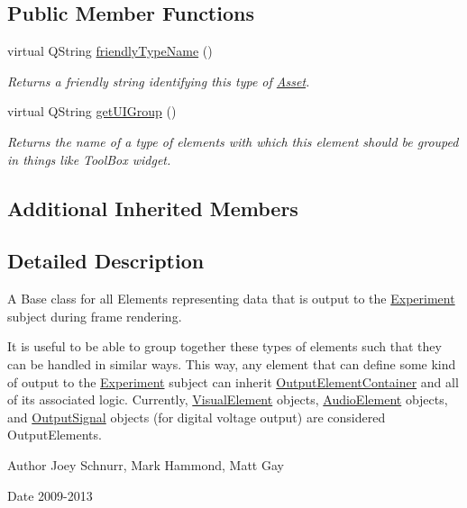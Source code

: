 \subsection*{Public Member Functions}
\begin{DoxyCompactItemize}
\item 
virtual Q\-String \hyperlink{class_picto_1_1_output_element_add3a6e0fe3d4ee7b4b466171eb437cbc}{friendly\-Type\-Name} ()
\begin{DoxyCompactList}\small\item\em Returns a friendly string identifying this type of \hyperlink{class_picto_1_1_asset}{Asset}. \end{DoxyCompactList}\item 
\hypertarget{class_picto_1_1_output_element_a711908f1d7aea5caf829c1f2b79ea60a}{virtual Q\-String \hyperlink{class_picto_1_1_output_element_a711908f1d7aea5caf829c1f2b79ea60a}{get\-U\-I\-Group} ()}\label{class_picto_1_1_output_element_a711908f1d7aea5caf829c1f2b79ea60a}

\begin{DoxyCompactList}\small\item\em Returns the name of a type of elements with which this element should be grouped in things like Tool\-Box widget. \end{DoxyCompactList}\end{DoxyCompactItemize}
\subsection*{Additional Inherited Members}


\subsection{Detailed Description}
A Base class for all Elements representing data that is output to the \hyperlink{class_picto_1_1_experiment}{Experiment} subject during frame rendering. 

It is useful to be able to group together these types of elements such that they can be handled in similar ways. This way, any element that can define some kind of output to the \hyperlink{class_picto_1_1_experiment}{Experiment} subject can inherit \hyperlink{class_picto_1_1_output_element_container}{Output\-Element\-Container} and all of its associated logic. Currently, \hyperlink{struct_picto_1_1_visual_element}{Visual\-Element} objects, \hyperlink{class_picto_1_1_audio_element}{Audio\-Element} objects, and \hyperlink{struct_picto_1_1_output_signal}{Output\-Signal} objects (for digital voltage output) are considered Output\-Elements. \begin{DoxyAuthor}{Author}
Joey Schnurr, Mark Hammond, Matt Gay 
\end{DoxyAuthor}
\begin{DoxyDate}{Date}
2009-\/2013 
\end{DoxyDate}


